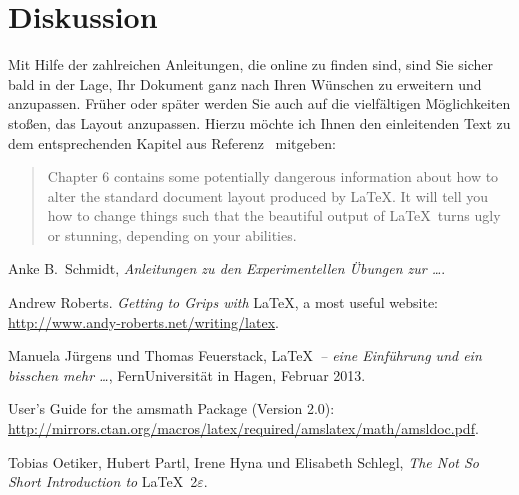 \documentclass[
	fontsize=11pt,
	paper=a4,
	pagesize=auto,
	parskip=half,
	titlepage=on,
	ngerman
]{scrartcl}
\begin{document}
\section{Diskussion}

Mit Hilfe der zahlreichen Anleitungen, die online zu finden sind, sind Sie sicher bald in der Lage, Ihr Dokument ganz nach Ihren Wünschen zu erweitern und anzupassen. Früher oder später werden Sie auch auf die vielfältigen Möglichkeiten stoßen, das Layout anzupassen. Hierzu möchte ich Ihnen den einleitenden Text zu dem entsprechenden Kapitel aus Referenz~\cite{lshort} mitgeben:

\begin{quote}
	Chapter 6 contains some potentially dangerous information about how to alter the standard document layout produced by \LaTeX. It will tell you how to change things such that the beautiful output of \LaTeX\ turns ugly or stunning, depending on your abilities.
\end{quote}

\begin{thebibliography}{9}

Anke B.~Schmidt, \emph{Anleitungen zu den Experimentellen Übungen zur \ldots}.

Andrew Roberts. \emph{Getting to Grips with} \LaTeX, a most useful website: \url{http://www.andy-roberts.net/writing/latex}.

Manuela Jürgens und Thomas Feuerstack, \LaTeX\ \emph{-- eine Einführung und ein bisschen mehr \ldots}, FernUniversität in Hagen, Februar 2013.

User’s Guide for the amsmath Package (Version 2.0): \url{http://mirrors.ctan.org/macros/latex/required/amslatex/math/amsldoc.pdf}.

Tobias Oetiker, Hubert Partl, Irene Hyna und Elisabeth Schlegl, \emph{The Not So Short Introduction to} \LaTeX\ 2$\varepsilon$.

\end{thebibliography}
\end{document}
